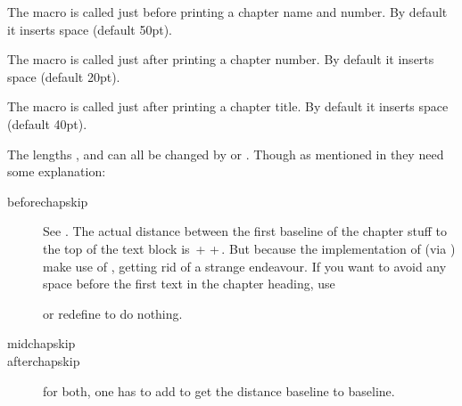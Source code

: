 The macro \cmd{\chapterheadstart} is called just before printing a chapter
name and number. By default it inserts \lnc{\beforechapskip} space (default
50pt).

The macro \cmd{\afterchapternum} is called just after printing a chapter
number. By default it inserts \lnc{\midchapskip} space (default
20pt).

The macro \cmd{\afterchaptertitle} is called just after printing a chapter
title. By default it inserts \lnc{\afterchapskip} space (default
40pt).

The lengths \lnc{\beforechapskip}, \lnc{\midchapskip} and \lnc{\afterchapskip}
can all be changed by \cmd{\setlength} or \cmd{\addtolength}. Though
as mentioned in  they need some explanation:
\begingroup
\medskip
\setlength\overfullrule{5pt}
\setlength\unitlength{\textwidth}
\addtolength{}
\renewcommand\descriptionlabel[1]{\hspace\labelsep\parbox{\unitlength}{\cs{#1}}}
\begin{description}
\item[beforechapskip] See .  The actual distance
  between the first baseline of the chapter stuff to the top of the
  text block is
  \cmd{\beforechapskip}\,+\,\cmd{\topskip}\,+\,\cmd{\baselineskip}.
  But because the implementation of \cmd{\chapter} (via
  \cmd{\chapterheadstart}) make use of \cmd{\vspace*}, getting rid of
  \cmd{\beforechapskip} a strange endeavour. If you want to avoid any
  space before the first text in the chapter heading, use
  \begin{lcode}
    \setlength\beforechapskip{-\baselineskip}
  \end{lcode}
  or redefine \cmd{\chapterheadstart} to do nothing.
\item[midchapskip] 
\item[afterchapskip] 
  for both, one has to add \cmd{\baselineskip} to
  get the distance baseline to baseline.
\end{description}
\endgroup





